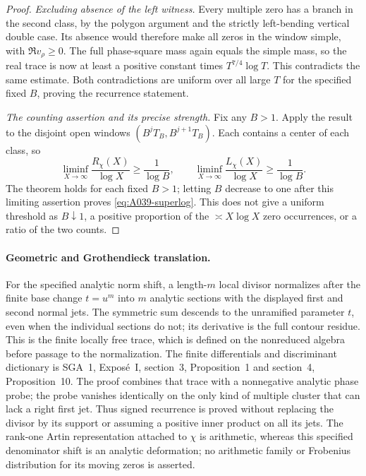 \begin{proof}
\emph{Excluding absence of the left witness.}
Every multiple zero has a branch in the second class, by the
polygon argument and the strictly left-bending vertical double
case. Its absence would therefore make all zeros in the window
simple, with $\Re v_\rho\ge0$. The full phase-square mass again
equals the simple mass, so the real trace is now at least a
positive constant times $T^{7/4}\log T$. This contradicts the
same estimate. Both contradictions are uniform over all large
$T$ for the specified fixed $B$, proving the recurrence statement.

\emph{The counting assertion and its precise strength.}
Fix any $B>1$. Apply the result to the disjoint open windows
$(B^jT_B,B^{j+1}T_B)$. Each contains a center of each class, so
\[
 \liminf_{X\to\infty}\frac{R_\chi(X)}{\log X}
       \ge\frac1{\log B},\qquad
 \liminf_{X\to\infty}\frac{L_\chi(X)}{\log X}
       \ge\frac1{\log B}.
\]
The theorem holds for each fixed $B>1$; letting $B$ decrease
to one after this limiting assertion proves
\eqref{eq:A039-superlog}. This does not give a uniform
threshold as $B\downarrow1$, a positive proportion of the
$\asymp X\log X$ zero occurrences, or a ratio of the two counts.
\end{proof}

\paragraph{Geometric and Grothendieck translation.}
For the specified analytic norm shift, a length-$m$ local divisor
normalizes after the finite base change $t=u^m$ into $m$ analytic
sections with the displayed first and second normal jets. The
symmetric sum descends to the unramified parameter $t$, even when
the individual sections do not; its derivative is the full contour
residue. This is the finite locally free trace, which is defined
on the nonreduced algebra before passage to the normalization.
The finite differentials and discriminant dictionary is SGA~1,
Expos\'e~I, section~3, Proposition~1 and section~4, Proposition~10.
The proof combines that trace with a nonnegative analytic phase
probe; the probe vanishes identically on the only kind of multiple cluster
that can lack a right first jet. Thus signed recurrence is proved
without replacing the divisor by its support or assuming a
positive inner product on all its jets. The rank-one Artin
representation attached to $\chi$ is arithmetic, whereas this
specified denominator shift is an analytic deformation; no
arithmetic family or Frobenius distribution for its moving zeros
is asserted.

